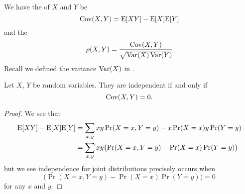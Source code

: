 We have the  of $X$ and $Y$ be
\begin{equation}
\mathop{\mathrm{Cov}}\nolimits(X,Y)=\mathrm{E}[XY]-\mathrm{E}[X]\mathrm{E}[Y]
\end{equation}
and the 
\begin{equation}
\rho(X,Y)=\frac{\mathop{\mathrm{Cov}}\nolimits(X,Y)}{\sqrt{\mathop{\mathrm{Var}}\nolimits(X)\mathop{\mathrm{Var}}\nolimits(Y)}}
\end{equation}
Recall we defined the variance $\mathop{\mathrm{Var}}\nolimits(X)$ in .

\begin{lemma}
Let $X$, $Y$ be random variables. They are independent if and only if 
\begin{equation}
\mathop{\mathrm{Cov}}\nolimits(X,Y)=0.
\end{equation}
\end{lemma}
\begin{proof}
We see that
\begin{equation}
\begin{split}
\mathrm{E}[XY]-\mathrm{E}[X]\mathrm{E}[Y]
&=\sum_{x,y}xy\mathop{\mathrm{Pr}}\nolimits(X=x,Y=y)-x\mathop{\mathrm{Pr}}\nolimits(X=x)y\mathop{\mathrm{Pr}}\nolimits(Y=y)\\
&=\sum_{x,y}xy\bigl(\mathop{\mathrm{Pr}}\nolimits(X=x,Y=y)-\mathop{\mathrm{Pr}}\nolimits(X=x)\mathop{\mathrm{Pr}}\nolimits(Y=y)\bigr)
\end{split}
\end{equation}
but we see independence for joint distributions precisely occurs when
\begin{equation}
\bigl(\Pr(X=x,Y=y)-\Pr(X=x)\Pr(Y=y)\bigr)=0
\end{equation}
for any $x$ and $y$.
\end{proof}

